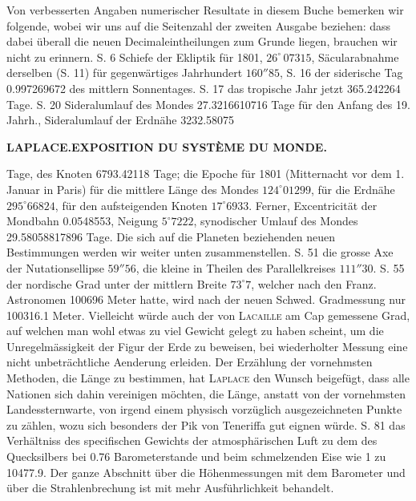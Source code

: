 Von verbesserten Angaben numerischer Resultate in diesem Buche bemerken wir folgende, wobei wir uns auf die Seitenzahl der zweiten Ausgabe beziehen: dass dabei überall die neuen Decimaleintheilungen zum Grunde liegen, brauchen wir nicht zu erinnern. S. 6 Schiefe der Ekliptik für 1801, $26^{\circ}\,07315$, Säcularabnahme derselben (S. 11) für gegenwärtiges Jahrhundert $160''85$, S. 16 der siderische Tag 0.997269672 des mittlern Sonnentages. S. 17 das tropische Jahr jetzt 365.242264 Tage. S. 20 Sideralumlauf des Mondes 27.3216610716 Tage für den Anfang des 19. Jahrh., Sideralumlauf der Erdnähe 3232.58075\par
\clearpage
\thispagestyle{empty}
\noindent{}%
\makebox[12mm][l]{}%
\parbox[t]{\dimexpr\linewidth-24mm\relax}{\centering\footnotesize\bfseries LAPLACE.\enspace EXPOSITION DU SYSTÈME DU MONDE.\par}%
\par\nobreak\medskip
\noindent Tage, des Knoten 6793.42118 Tage; die Epoche für 1801 (Mitternacht vor dem 1. Januar in Paris) für die mittlere Länge des Mondes $124^{\circ}01299$, für die Erdnähe $295^{\circ}66824$, für den aufsteigenden Knoten $17^{\circ}6933$. Ferner, Excentricität der Mondbahn 0.0548553, Neigung $5^{\circ}7222$, synodischer Umlauf des Mondes 29.58058817896 Tage. Die sich auf die Planeten beziehenden neuen Bestimmungen werden wir weiter unten zusammenstellen. S. 51 die grosse Axe der Nutationsellipse $59''56$, die kleine in Theilen des Parallelkreises $111''30$. S. 55 der nordische Grad unter der mittlern Breite $73^{\circ}7$, welcher nach den Franz. Astronomen 100696 Meter hatte, wird nach der neuen Schwed. Gradmessung nur 100316.1 Meter. Vielleicht würde auch der von \textsc{Lacaille} am Cap gemessene Grad, auf welchen man wohl etwas zu viel Gewicht gelegt zu haben scheint, um die Unregelmässigkeit der Figur der Erde zu beweisen, bei wiederholter Messung eine nicht unbeträchtliche Aenderung erleiden. Der Erzählung der vornehmsten Methoden, die Länge zu bestimmen, hat \textsc{Laplace} den Wunsch beigefügt, dass alle Nationen sich dahin vereinigen möchten, die Länge, anstatt von der vornehmsten Landessternwarte, von irgend einem physisch vorzüglich ausgezeichneten Punkte zu zählen, wozu sich besonders der Pik von Teneriffa gut eignen würde. S. 81 das Verhältniss des specifischen Gewichts der atmosphärischen Luft zu dem des Quecksilbers bei 0.76 Barometerstande und beim schmelzenden Eise wie 1 zu 10477.9. Der ganze Abschnitt über die Höhenmessungen mit dem Barometer und über die Strahlenbrechung ist mit mehr Ausführlichkeit behandelt.


